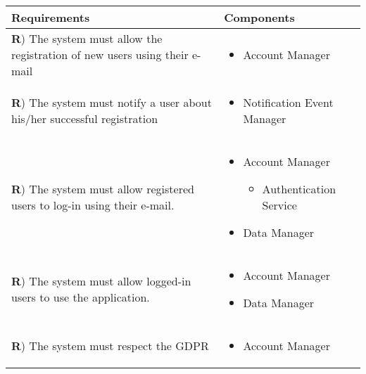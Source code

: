 \documentclass[../DD.tex]{subfiles}
\newcounter{rown}
\newcommand{\rowIndex}{\arabic{rown}\stepcounter{rown}}
\begin{document}
    \begin{table}[h!]
        \begin{center}
            \hspace*{-2cm}
            \begin{tabular}{|m{20em}|m{20em}|}
            \hline
            \textbf{Requirements} & \textbf{Components}\\
            \hline
            \textbf{R\rowIndex}) The system must allow the registration of new users using their e-mail & \begin{itemize}
                \item Account Manager
            \end{itemize}\\
            \hline
            \textbf{R\rowIndex}) The system must notify a user about his/her successful registration & \begin{itemize}
                \item  Notification Event Manager
            \end{itemize}\\
            \hline
            \textbf{R\rowIndex}) The system must allow registered users to log-in using their e-mail. & \begin{itemize}
                \item Account Manager
                \begin{itemize}
                    \item Authentication Service
                \end{itemize}
                \item Data Manager
            \end{itemize}\\
            \hline
            \textbf{R\rowIndex}) The system must allow logged-in users to use the application. & \begin{itemize}
                \item Account Manager
                \item Data Manager
            \end{itemize}\\
            \hline
            \textbf{R\rowIndex}) The system must respect the GDPR & \begin{itemize}
                \item Account Manager

\end{itemize}
\end{tabular}
\end{center}
\end{table}
\end{document}
